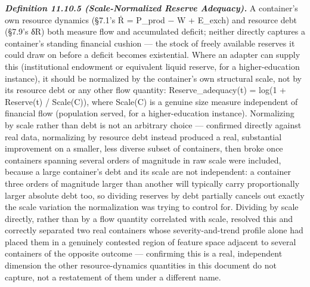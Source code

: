 \documentclass[
]{article}
\begin{document}
\emph{\textbf{Definition 11.10.5 (Scale-Normalized Reserve Adequacy).}}
A container's own resource dynamics (§7.1's Ṙ = P\_prod − W + E\_exch)
and resource debt (§7.9's δR) both measure flow and accumulated deficit;
neither directly captures a container's standing financial cushion ---
the stock of freely available reserves it could draw on before a deficit
becomes existential. Where an adapter can supply this (institutional
endowment or equivalent liquid reserve, for a higher-education
instance), it should be normalized by the container's own structural
scale, not by its resource debt or any other flow quantity:
Reserve\_adequacy(t) = log(1 + Reserve(t) / Scale(C)), where Scale(C) is
a genuine size measure independent of financial flow (population served,
for a higher-education instance). Normalizing by scale rather than debt
is not an arbitrary choice --- confirmed directly against real data,
normalizing by resource debt instead produced a real, substantial
improvement on a smaller, less diverse subset of containers, then broke
once containers spanning several orders of magnitude in raw scale were
included, because a large container's debt and its scale are not
independent: a container three orders of magnitude larger than another
will typically carry proportionally larger absolute debt too, so
dividing reserves by debt partially cancels out exactly the scale
variation the normalization was trying to control for. Dividing by scale
directly, rather than by a flow quantity correlated with scale, resolved
this and correctly separated two real containers whose
severity-and-trend profile alone had placed them in a genuinely
contested region of feature space adjacent to several containers of the
opposite outcome --- confirming this is a real, independent dimension
the other resource-dynamics quantities in this document do not capture,
not a restatement of them under a different name.
\end{document}
